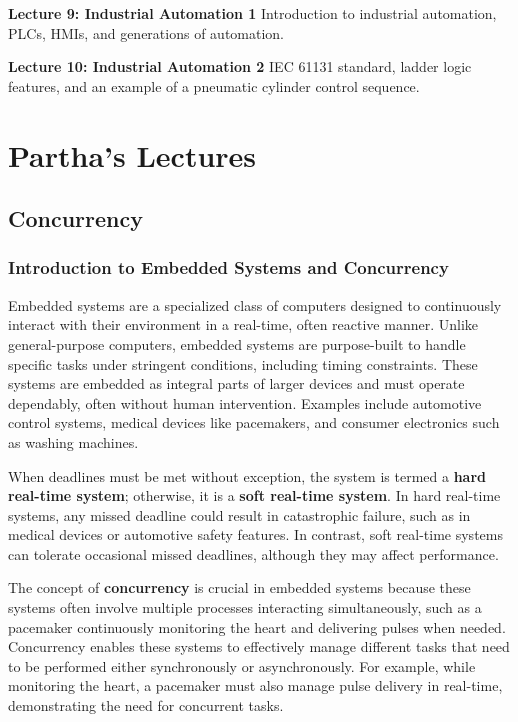\documentclass[
  14pt,
  a4paper,
  numbers=noendperiod,
  headinclude=true,
  footinclude=true,
  DIV=calc]{scrreprt}
\begin{document}
\textbf{Lecture 9: Industrial Automation 1} Introduction to industrial
automation, PLCs, HMIs, and generations of automation.

\textbf{Lecture 10: Industrial Automation 2} IEC 61131 standard, ladder
logic features, and an example of a pneumatic cylinder control sequence.

\part{Partha's Lectures}

\chapter{Concurrency}\label{concurrency}

\section{Introduction to Embedded Systems and
Concurrency}\label{introduction-to-embedded-systems-and-concurrency}

Embedded systems are a specialized class of computers designed to
continuously interact with their environment in a real-time, often
reactive manner. Unlike general-purpose computers, embedded systems are
purpose-built to handle specific tasks under stringent conditions,
including timing constraints. These systems are embedded as integral
parts of larger devices and must operate dependably, often without human
intervention. Examples include automotive control systems, medical
devices like pacemakers, and consumer electronics such as washing
machines.

When deadlines must be met without exception, the system is termed a
\textbf{hard real-time system}; otherwise, it is a \textbf{soft
real-time system}. In hard real-time systems, any missed deadline could
result in catastrophic failure, such as in medical devices or automotive
safety features. In contrast, soft real-time systems can tolerate
occasional missed deadlines, although they may affect performance.

The concept of \textbf{concurrency} is crucial in embedded systems
because these systems often involve multiple processes interacting
simultaneously, such as a pacemaker continuously monitoring the heart
and delivering pulses when needed. Concurrency enables these systems to
effectively manage different tasks that need to be performed either
synchronously or asynchronously. For example, while monitoring the
heart, a pacemaker must also manage pulse delivery in real-time,
demonstrating the need for concurrent tasks.
\end{document}
